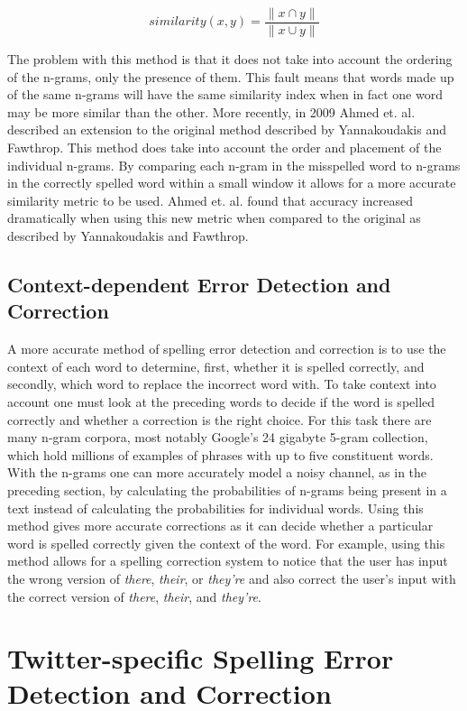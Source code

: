 \[
similarity(x,y) = \frac{\|x \cap y \|}{\|x \cup y \|}
\]

The problem with this method is that it does not take into account the ordering of the n-grams, only the presence of them. This fault means that words made up of the same n-grams will have the same similarity index when in fact one word may be more similar than the other. More recently, in 2009 Ahmed et. al. described an extension to the original method described by Yannakoudakis and Fawthrop. This method does take into account the order and placement of the individual n-grams. By comparing each n-gram in the misspelled word to n-grams in the correctly spelled word within a small window it allows for a more accurate similarity metric to be used. Ahmed et. al. found that accuracy increased dramatically when using this new metric when compared to the original as described by Yannakoudakis and Fawthrop.

\subsection{Context-dependent Error Detection and Correction}

A more accurate method of spelling error detection and correction is to use the context of each word to determine, first, whether it is spelled correctly, and secondly, which word to replace the incorrect word with. To take context into account one must look at the preceding words to decide if the word is spelled correctly and whether a correction is the right choice. For this task there are many n-gram corpora, most notably Google's 24 gigabyte 5-gram collection, which hold millions of examples of phrases with up to five constituent words. With the n-grams one can more accurately model a noisy channel, as in the preceding section, by calculating the probabilities of n-grams being present in a text instead of calculating the probabilities for individual words. Using this method gives more accurate corrections as it can decide whether a particular word is spelled correctly given the context of the word. For example, using this method allows for a spelling correction system to notice that the user has input the wrong version of \emph{there}, \emph{their}, or \emph{they're} and also correct the user's input with the correct version of \emph{there}, \emph{their}, and \emph{they're}.

\section{Twitter-specific Spelling Error Detection and Correction}

